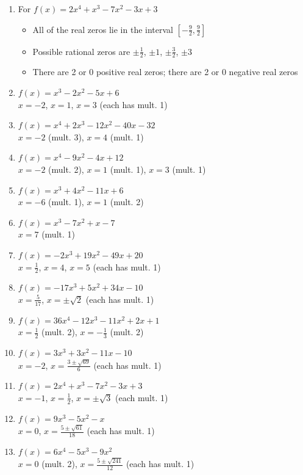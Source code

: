 \begin{enumerate}
\item For   $f(x) = 2x^4+x^3-7x^2-3x+3$
\begin{itemize}
\item  All of the real zeros lie in the interval $\left[-\frac{9}{2},\frac{9}{2}\right]$
\item  Possible rational zeros are  $\pm \frac{1}{2}$, $\pm 1$,  $\pm \frac{3}{2}$, $\pm 3$
\item  There are 2 or 0 positive real zeros;  there are 2 or 0 negative real zeros
\end{itemize}


\item $f(x) = x^{3} - 2x^{2} - 5x + 6$ \\ $x = -2$, $x = 1$, $x = 3$ (each has mult. 1)
\item $f(x) = x^{4} + 2x^{3} - 12x^{2} - 40x - 32$ \\ $x = -2$ (mult. 3), $x = 4$ (mult. 1)


\item $f(x) = x^{4} - 9x^{2} - 4x + 12$ \\ $x = -2$ (mult. 2), $x = 1$ (mult. 1), $x = 3$ (mult. 1)
\item $f(x) = x^{3} + 4x^{2} - 11x + 6$ \\ $x = -6$ (mult. 1), $x = 1$ (mult. 2)

\item $f(x) = x^{3} - 7x^{2} + x - 7$ \\ $x = 7$ (mult. 1)
\item $f(x) = -2x^{3} + 19x^{2} - 49x + 20$ \\ $x = \frac{1}{2}$, $x = 4$, $x = 5$ (each has mult. 1)

\item $f(x) = -17x^{3} + 5x^{2} + 34x - 10$ \\ $x = \frac{5}{17}$, $x = \pm \sqrt{2}$ (each has mult. 1)
\item $f(x) = 36x^{4} - 12x^{3} - 11x^{2} + 2x + 1$ \\ $x = \frac{1}{2}$ (mult. 2), $x = -\frac{1}{3}$ (mult. 2)

\item $f(x) = 3x^{3} + 3x^{2} - 11x - 10$ \\ $x = -2$, $x = \frac{3 \pm \sqrt{69}}{6}$ (each has mult. 1)
\item $f(x) = 2x^4+x^3-7x^2-3x+3$ \\ $x = -1$, $x = \frac{1}{2}$, $x=\pm \sqrt{3}$ (each mult. 1)

\item $f(x) = 9x^{3} - 5x^{2} - x$ \\ $x = 0$, $x = \frac{5 \pm \sqrt{61}}{18}$ (each has mult. 1)
\item $f(x) = 6x^{4} - 5x^{3} - 9x^{2}$ \\ $x = 0$ (mult. 2), $x = \frac{5 \pm \sqrt{241}}{12}$ (each has mult. 1)


\end{enumerate}
